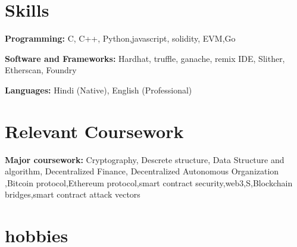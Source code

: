 \documentclass[letterpaper,11pt]{article}
\newcommand{\resumeSubHeadingListStart}{\begin{itemize}[leftmargin=0.15in, label={}]}
\newcommand{\resumeSubHeadingListEnd}{\end{itemize}}
\begin{document}
\section{Skills}
  \vspace{2pt}
  \resumeSubHeadingListStart
    \small{\item{
        \textbf{Programming:}{ C, C++, Python,javascript, solidity, EVM,Go } \\ \vspace{3pt}

        \textbf{Software and Frameworks:}{ Hardhat, truffle, ganache, 
remix IDE, Slither, Etherscan, Foundry } \\ \vspace{3pt}
        
        
        
        \textbf{Languages:}{ Hindi (Native), English (Professional)}
        
    }}
  \resumeSubHeadingListEnd




\section{Relevant Coursework}
  \vspace{2pt}
  \resumeSubHeadingListStart
    \small{\item{
        \textbf{Major coursework:}{ Cryptography, Descrete structure, Data Structure and algorithm, Decentralized Finance, Decentralized Autonomous Organization ,Bitcoin protocol,Ethereum protocol,smart contract security,web3,S,Blockchain bridges,smart contract attack vectors} \\ \vspace{3pt}
        
    }}
  \resumeSubHeadingListEnd




\section{hobbies}


  \vspace{2pt}
  {}
\end{document}
